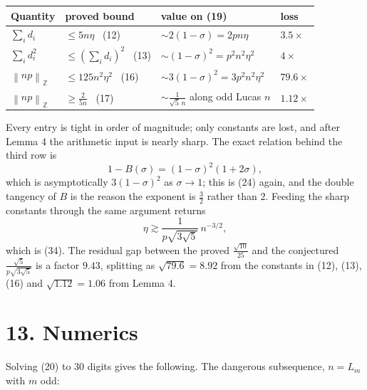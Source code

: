 \documentclass[12pt]{article}
\newcommand{\ZZ}{\mathbb Z}
\newcommand{\normZ}[1]{\left\lVert #1\right\rVert_{\ZZ}}
\begin{document}
\begin{center}
\small
\renewcommand{\arraystretch}{1.45}
\begin{tabularx}{\textwidth}{@{}>{\raggedright\arraybackslash}p{}XXX@{}}
\toprule
Quantity & proved bound & value on (19) & loss \\
\midrule
\(\sum_i d_i\)
& \(\le5n\eta\) \ (12)
& \(\sim2(1-\sigma)=2pn\eta\)
& \(3.5\times\) \\
\(\sum_i d_i^2\)
& \(\le(\sum_i d_i)^2\) \ (13)
& \(\sim(1-\sigma)^2=p^2n^2\eta^2\)
& \(4\times\) \\
\(\normZ{np}\)
& \(\le125n^2\eta^2\) \ (16)
& \(\sim3(1-\sigma)^2=3p^2n^2\eta^2\)
& \(79.6\times\) \\
\(\normZ{np}\)
& \(\ge\frac2{5n}\) \ (17)
& \(\sim\frac1{\sqrt5\,n}\) along odd Lucas \(n\)
& \(1.12\times\) \\
\bottomrule
\end{tabularx}
\end{center}

Every entry is tight in order of magnitude; only constants are lost, and
after Lemma 4 the arithmetic input is nearly sharp. The exact relation
behind the third row is
\[
1-B(\sigma)=(1-\sigma)^2(1+2\sigma),
\]
which is asymptotically \(3(1-\sigma)^2\) as \(\sigma\to1\); this is (24)
again, and the double tangency of \(B\) is the reason the exponent is
\(\frac32\) rather than \(2\). Feeding the sharp constants through the
same argument returns
\[
\eta\gtrsim\frac{1}{p\sqrt{3\sqrt5}}\,n^{-3/2},
\]
which is (34). The residual gap between the proved
\(\frac{\sqrt{10}}{25}\) and the conjectured
\(\frac{\sqrt5}{p\sqrt{3\sqrt5}}\) is a factor \(9.43\), splitting as
\(\sqrt{79.6}=8.92\) from the constants in (12), (13), (16) and
\(\sqrt{1.12}=1.06\) from Lemma 4.

\section*{13. Numerics}

Solving (20) to \(30\) digits gives the following. The dangerous
subsequence, \(n=L_m\) with \(m\) odd:
\end{document}
